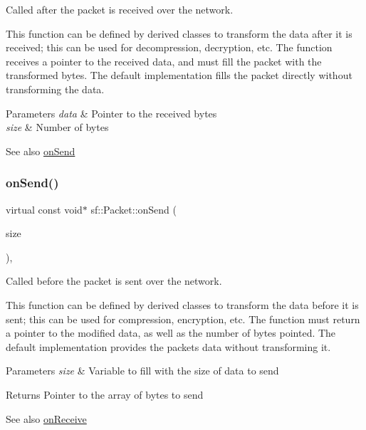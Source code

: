 Called after the packet is received over the network. 

This function can be defined by derived classes to transform the data after it is received; this can be used for decompression, decryption, etc. The function receives a pointer to the received data, and must fill the packet with the transformed bytes. The default implementation fills the packet directly without transforming the data.


\begin{DoxyParams}{Parameters}
{\em data} & Pointer to the received bytes \\
\hline
{\em size} & Number of bytes\\
\hline
\end{DoxyParams}
\begin{DoxySeeAlso}{See also}
\hyperlink{classsf_1_1_packet_a052e955906c9bfd671622cb625380edc}{on\+Send} 
\end{DoxySeeAlso}
\mbox{\label{classsf_1_1_packet_a052e955906c9bfd671622cb625380edc}} 
\subsubsection{\texorpdfstring{on\+Send()}{onSend()}}
{\footnotesize\ttfamily virtual const void$\ast$ sf\+::\+Packet\+::on\+Send (\begin{DoxyParamCaption}\item[{std\+::size\+\_\+t \&}]{size }\end{DoxyParamCaption})\hspace{0.3cm}{\ttfamily [protected]}, {\ttfamily [virtual]}}



Called before the packet is sent over the network. 

This function can be defined by derived classes to transform the data before it is sent; this can be used for compression, encryption, etc. The function must return a pointer to the modified data, as well as the number of bytes pointed. The default implementation provides the packet\textquotesingle{}s data without transforming it.


\begin{DoxyParams}{Parameters}
{\em size} & Variable to fill with the size of data to send\\
\hline
\end{DoxyParams}
\begin{DoxyReturn}{Returns}
Pointer to the array of bytes to send
\end{DoxyReturn}
\begin{DoxySeeAlso}{See also}
\hyperlink{classsf_1_1_packet_ab71a31ef0f1d5d856de6f9fc75434128}{on\+Receive} 
\end{DoxySeeAlso}
\mbox{\label{classsf_1_1_packet_a8ab20be4a63921b7cb1a4d8ca5c30f75}} 
